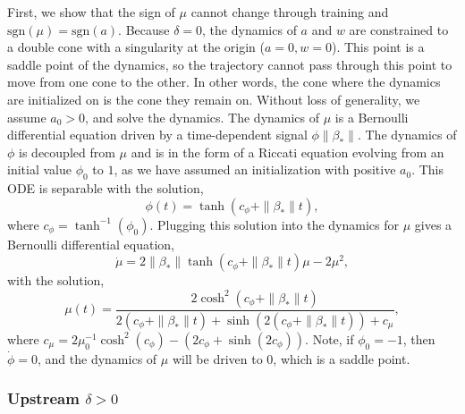 \documentclass{article}
\theoremstyle{plain}
\theoremstyle{definition}
\theoremstyle{remark}
\begin{document}
First, we show that the sign of $\mu$ cannot change through training and $\mathrm{sgn}(\mu) = \mathrm{sgn}(a)$.
%
Because $\delta = 0$, the dynamics of $a$ and $w$ are constrained to a double cone with a singularity at the origin ($a = 0, w = 0$). 
%
This point is a saddle point of the dynamics, so the trajectory cannot pass through this point to move from one cone to the other. 
%
In other words, the cone where the dynamics are initialized on is the cone they remain on.
%
Without loss of generality, we assume $a_0 > 0$, and solve the dynamics.
%
The dynamics of $\mu$ is a Bernoulli differential equation driven by a time-dependent signal $\phi \|\beta_*\|$.
%
The dynamics of $\phi$ is decoupled from $\mu$ and is in the form of a Riccati equation evolving from an initial value $\phi_0$ to $1$, as we have assumed an initialization with positive $a_0$.
%
This ODE is separable with the solution,
\begin{equation}
    \phi(t) = \tanh\left(c_\phi + \|\beta_*\| t\right),
\end{equation}
where $c_\phi = \tanh^{-1}(\phi_0)$.
%
Plugging this solution into the dynamics for $\mu$ gives a Bernoulli differential equation,
\begin{equation}
    \dot{\mu} = 2\|\beta_*\|\tanh\left(c_\phi + \|\beta_*\| t\right) \mu  - 2 \mu^2,
\end{equation}
with the solution,
\begin{equation}
    \mu(t) = \frac{2\cosh^2\left(c_\phi + \|\beta_*\|t\right)}{2\left(c_\phi + \|\beta_*\|t\right) + \sinh\left(2(c_\phi + \|\beta_*\|t)\right) + c_\mu},
\end{equation}
where $c_\mu = 2\mu_0^{-1}\cosh^2(c_\phi) - \left(2c_\phi + \sinh(2c_\phi)\right)$.
%
Note, if $\phi_0 = -1$, then $\dot{\phi} = 0$, and the dynamics of $\mu$ will be driven to $0$, which is a saddle point.


\subsubsection{Upstream \texorpdfstring{$\delta > 0$}{}} 
\label{app:single-neuron-positive}
\end{document}
